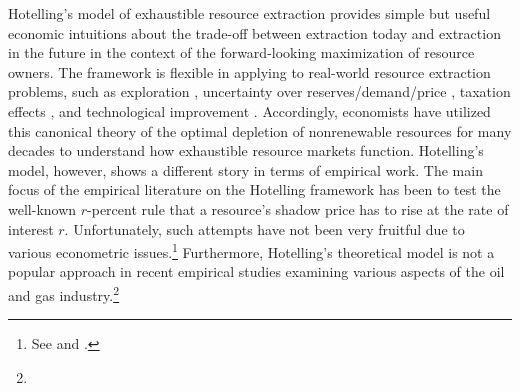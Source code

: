 Hotelling's model of exhaustible resource extraction provides simple but useful economic intuitions about the trade-off between extraction today and extraction in the future in the context of the forward-looking maximization of resource owners. The framework is flexible in applying to real-world resource extraction problems, such as exploration \citep{The-Optimal-Exploration-and-Production-of-Nonrenewable-Resources_Pindyck_1978, Optimal-Pricing-Use-and-Exploration-of-Uncertain-Natural-Resource-Stocks_Arrow-and-Chang_1982, Exploration-and-Exhaustible-Resources_The-Microfoundations-of-Aggregate-Models_Swierzbinski-and-Mendelsohn_1989, Exhaustible-Resources_A-Theory-of-Exploration_Quyen_1991}, uncertainty over reserves/demand/price \citep{Optimal-Depletion-of-an-Uncertain-Stock_Gilber_1979, Uncertainty-and-Exhaustible-Resource-Markets_Pindyck_1980, The-Optimal-Production-of-an-Exhaustible-Resource-When-Price-is-Exogenous-and-Stochastic_Pindyck_1981, Extraction-at-the-Intensive-Margin_Farrow-and-Krautkraemer_1989}, taxation effects \citep{Economics-of-Depletatble-Resources_Market-Forces-and-Intertemporal-Bias_Sweeney_1977, The-Taxation-of-Nonreplenishable-Natural-Resources-Revisited_Heaps_1985}, and technological improvement \citep{Growth-with-Exhaustible-Natural-Resources_Efficient-and-Optimal-Growth-Paths_Stiglitz_1974, Trends-in-Natural-Resource-Commodity-Prices_An-Analysis-of-the-Time-Domain_Slade_1982}. Accordingly, economists have utilized this canonical theory of the optimal depletion of nonrenewable resources for many decades to understand how exhaustible resource markets function. Hotelling's model, however, shows a different story in terms of empirical work. The main focus of the empirical literature on the Hotelling framework has been to test the well-known $r$-percent rule that a resource's shadow price has to rise at the rate of interest $r$. Unfortunately, such attempts have not been very fruitful due to various econometric issues.\footnote{See \cite{Natural-Resource-Economics-under-the-Rule-of-Hotelling_Gaudet_2007} and \cite{Whither-Hotelling-Tests-of-the-Theory-of-Exhaustible-Resources_Slade-and-Thille_2009}.} Furthermore, Hotelling's theoretical model is not a popular approach in recent empirical studies examining various aspects of the oil and gas industry.\footnote{
}
